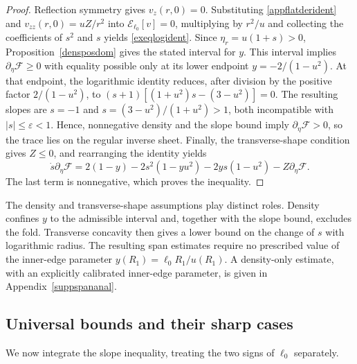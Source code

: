 \documentclass[amsmath,amsfonts,amssymb,aps,pra,superscriptaddress,10pt]{revtex4-2}
\numberwithin{equation}{section}
\theoremstyle{plain}
\theoremstyle{definition}
\theoremstyle{remark}
\theoremstyle{definition}
\newcommand{\ellzero}{\ell_0}
\newcommand{\EE}{\mathcal E_{\ellzero}}
\begin{document}
\begin{proof}
Reflection symmetry gives $v_z(r,0)=0$. Substituting \eqref{appflatderident} and $v_{zz}(r,0)=uZ/r^2$ into $\EE[v]=0$, multiplying by $r^2/u$ and collecting the coefficients of $s^2$ and $s$ yields \eqref{exeqlogident}. Since $\eta_r=u(1+s)>0$, Proposition~\ref{densposdom} gives the stated interval for $y$. This interval implies $\partial_\eta\mathcal{F}\geq 0$ with equality possible only at its lower endpoint $y=-2/(1-u^2)$. At that endpoint, the logarithmic identity reduces, after division by the positive factor $2/(1-u^2)$, to $(s+1)[(1+u^2)s-(3-u^2)]=0$. The resulting slopes are $s=-1$ and $s=(3-u^2)/(1+u^2)>1$, both incompatible with $|s|\leq\varepsilon<1$. Hence, nonnegative density and the slope bound imply $\partial_\eta\mathcal{F}>0$, so the trace lies on the regular inverse sheet. Finally, the transverse-shape condition gives $Z\leq 0$, and rearranging the identity yields
\begin{equation}
\dot{s}\partial_\eta\mathcal{F}=2(1-y)-2s^2(1-yu^2)-2ys(1-u^2)
-Z\partial_\eta\mathcal{F}.
\end{equation}
The last term is nonnegative, which proves the inequality.
\end{proof}

The density and transverse-shape assumptions play distinct roles. Density confines $y$ to the admissible interval and, together with the slope bound, excludes the fold. Transverse concavity then gives a lower bound on the change of $s$ with logarithmic radius. The resulting span estimates require no prescribed value of the inner-edge parameter $y(R_1)=\ellzero R_1/u(R_1)$. A density-only estimate, with an explicitly calibrated inner-edge parameter, is given in Appendix~\ref{suppspananal}.

\subsection{Universal bounds and their sharp cases}

We now integrate the slope inequality, treating the two signs of $\ellzero$ separately.
\end{document}
